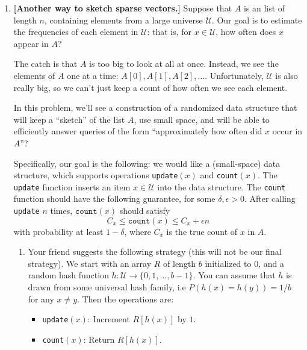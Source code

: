 \begin{enumerate}


\item {} \textbf{[Another way to sketch sparse vectors.]}
Suppose that $A$ is an list of length $n$, containing elements from a large universe $\mathcal{U}$.  Our goal is to estimate the frequencies of each element in $\mathcal{U}$: that is, for $x \in \mathcal{U}$, how often does $x$ appear in $A$?  

The catch is that $A$ is too big to look at all at once.  Instead, we see the elements of $A$ one at a time: $A[0], A[1], A[2], \ldots$.  Unfortunately, $\mathcal{U}$ is also really big, so we can't just keep a count of how often we see each element.

In this problem, we'll see a construction of a randomized data structure that will keep a ``sketch'' of the list $A$, use small space, and will be able to efficiently answer queries of the form ``approximately how often did $x$ occur in $A$''? 

Specifically, our goal is the following: we would like a (small-space) data structure, which supports operations \texttt{update}$(x)$ and \texttt{count}$(x)$.  The \texttt{update} function inserts an item $x  \in \mathcal{U}$ into the data structure. 
The \texttt{count} function should have the following guarantee,
for some $\delta, \epsilon > 0$. After calling \texttt{update} $n$ times,  $\texttt{count}(x)$ should satisfy
\begin{equation}\label{eq:want}
C_x \le \texttt{count}(x) \le C_x + \epsilon n
\end{equation}
with probability at least $1 - \delta$, where $C_x$ is the true count of $x$ in $A$.

\begin{enumerate}
\item {} Your friend suggests the following strategy (this will not be our final strategy). We start with an array $R$ of length $b$ initialized to 0, and a random hash function $h:\mathcal{U} \to \{0,1,\ldots, b - 1\}$. 
You can assume that $h$ is drawn from some universal hash family, i.e $P(h(x) = h(y)) = 1/b$ for any $x \ne y$. 
Then the operations are:
\begin{itemize}
\item\texttt{update}$(x)$: Increment $R[h(x)]$ by $1$.
\item \texttt{count}$(x)$: Return $R[h(x)]$.
\end{itemize}


\end{enumerate}
\end{enumerate}
